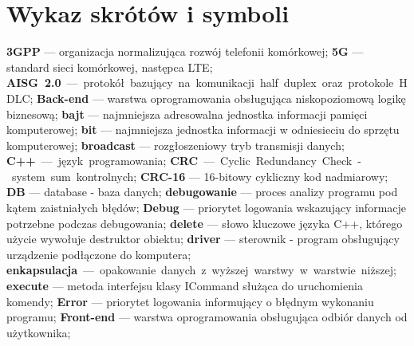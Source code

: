 \chapter*{Wykaz skrótów i symboli}
\noindent
\textbf{3GPP} --- organizacja normalizująca rozwój telefonii komórkowej;\newline
\textbf{5G} --- standard sieci komórkowej, następca LTE;\newline
\textbf{AISG 2.0} --- protokół bazujący na komunikacji half duplex oraz protokole HDLC;\newline
\textbf{Back-end} --- warstwa oprogramowania obsługująca niskopoziomową logikę biznesową;\newline
\textbf{bajt} --- najmniejsza adresowalna jednostka informacji pamięci komputerowej;\newline
\textbf{bit} --- najmniejsza jednostka informacji w odniesieciu do sprzętu komputerowej;\newline
\textbf{broadcast} --- rozgłoszeniowy tryb transmisji danych;\newline
\textbf{C++} --- język programowania;\newline
\textbf{CRC} --- Cyclic Redundancy Check - system sum kontrolnych;\newline
\textbf{CRC-16} --- 16-bitowy cykliczny kod nadmiarowy;\newline
\textbf{DB} --- database - baza danych;\newline
\textbf{debugowanie} --- proces analizy programu pod kątem zaistniałych błędów;\newline
\textbf{Debug} --- priorytet logowania wskazujący informacje potrzebne podczas debugowania;\newline
\textbf{delete} --- słowo kluczowe języka C++, którego użycie wywołuje destruktor obiektu;\newline
\textbf{driver} --- sterownik - program obsługujący urządzenie podłączone do komputera;\newline
\textbf{enkapsulacja} --- opakowanie danych z wyższej warstwy w warstwie niższej;\newline
\textbf{execute} --- metoda interfejsu klasy ICommand służąca do uruchomienia komendy;\newline
\textbf{Error} --- priorytet logowania informujący o błędnym wykonaniu programu;\newline
\textbf{Front-end} --- warstwa oprogramowania obsługująca odbiór danych od użytkownika;\newline

